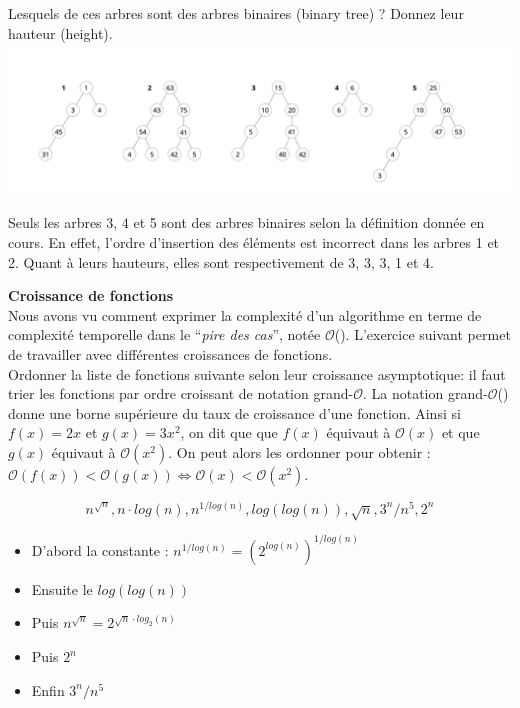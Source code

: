 \begin{Exercice}
	Lesquels de ces arbres sont des arbres binaires (binary tree) ? Donnez leur hauteur (height).
        		\centering
       	 	\includegraphics[width=18cm]{resources/exercice5.png}

	\begin{solution}
		Seuls les arbres 3, 4 et 5 sont des arbres binaires selon la définition donnée en cours. En effet, l'ordre d'insertion des éléments est incorrect dans les arbres 1 et 2. 
		Quant à leurs hauteurs, elles sont respectivement de 3, 3, 3, 1 et 4.
	\end{solution}
\end{Exercice}


\begin{Exercice}[10 minutes]\textbf{Croissance de fonctions}\\
Nous avons vu comment exprimer la complexité d'un algorithme en terme de complexité temporelle dans le ``\emph{pire des cas}'', notée $\mathcal{O}$(). L'exercice suivant permet de travailler avec différentes croissances de fonctions.\\ Ordonner la liste de fonctions suivante selon leur croissance asymptotique: il faut trier les fonctions par ordre croissant de notation grand-$\mathcal{O}$. La notation grand-$\mathcal{O}$() donne une borne supérieure du taux de croissance d'une fonction. Ainsi si $f(x) = 2x$ et $g(x) = 3x^2$, on dit que que $f(x)$ équivaut à $\mathcal{O}(x)$ et que $g(x)$ équivaut à $\mathcal{O}(x^2)$. On peut alors les ordonner pour obtenir : $\mathcal{O}(f(x)) < \mathcal{O}(g(x)) \Leftrightarrow \mathcal{O}(x) < \mathcal{O}(x^2)$.

	\begin{equation}
		n^{\sqrt{n}}, n\cdot log(n), n^{1/log(n)}, log(log(n)), \sqrt{n}, 3^{n}/{n^5}, 2^n
	\end{equation}
	
	\begin{solution}
		\begin{itemize}
			\item D'abord la constante : $n^{1/log(n)} = (2^{log(n)})^{1/log(n)}$
			\item Ensuite le $log(log(n))$
			\item Puis $n^{\sqrt{n}} = 2^{\sqrt{n}\cdot log_2(n)}$
			\item Puis $2^n$
			\item Enfin  $3^{n}/{n^5}$
		\end{itemize}
	\end{solution}
\end{Exercice}


